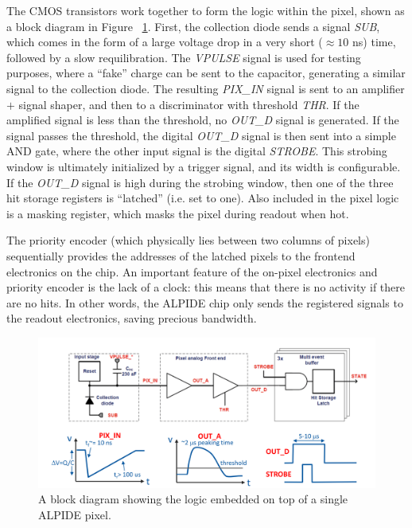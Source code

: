 The CMOS transistors work together to form the logic within the pixel, shown as a block diagram in Figure ~\ref{fig:alpide_l}. First, the collection diode sends a signal \textit{SUB}, which comes in the form of a large voltage drop in a very short ($\approx 10$ ns) time, followed by a slow requilibration. The \textit{VPULSE} signal is used for testing purposes, where a ``fake'' charge can be sent to the capacitor, generating a similar signal to the collection diode. The resulting \textit{PIX\_IN} signal is sent to an amplifier $+$ signal shaper, and then to a discriminator with threshold \textit{THR}. If the amplified signal is less than the threshold, no \textit{OUT\_D} signal is generated. If the signal passes the threshold, the digital \textit{OUT\_D} signal is then sent into a simple AND gate, where the other input signal is the digital \textit{STROBE}. This strobing window is ultimately initialized by a trigger signal, and its width is configurable. If the \textit{OUT\_D} signal is high during the strobing window, then one of the three hit storage registers is ``latched'' (i.e. set to one). Also included in the pixel logic is a masking register, which masks the pixel during readout when hot. 

The priority encoder (which physically lies between two columns of pixels) sequentially provides the addresses of the latched pixels to the frontend electronics on the chip. An important feature of the on-pixel electronics and priority encoder is the lack of a clock: this means that there is no activity if there are no hits. In other words, the ALPIDE chip only sends the registered signals to the readout electronics, saving precious bandwidth.

\begin{figure}
    \centering
    \includegraphics[width=1.0\textwidth]{figures/experiment/alpide_logic.png}
    \caption{A block diagram showing the logic embedded on top of a single ALPIDE pixel.}
    \label{fig:alpide_l}
\end{figure}

